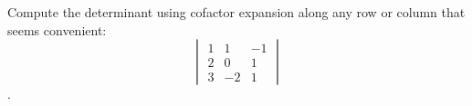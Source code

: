 \documentclass[11pt,letterpaper,boxed]{hmcpset}
\begin{document}
\begin{solution}
    \vfill
\end{solution}

\newpage


\begin{problem}[4.2 \#8]
    Compute the determinant using cofactor expansion along any row or column that seems convenient:
    \[\begin{vmatrix}
    1 &  1 & -1 \\
    2 &  0 &  1 \\
    3 & -2 &  1 
    \end{vmatrix}\].
\end{problem}

\begin{solution}
    \vfill
\end{solution}

\newpage
\end{document}
